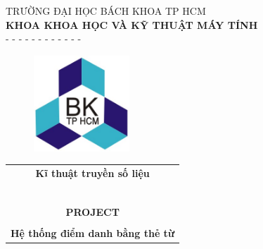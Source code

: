 \documentclass[12pt,titlepage,a4paper]{article}
\begin{document}
\begin{titlepage}
\vspace{0cm}
\begin{center}
TRƯỜNG ĐẠI HỌC BÁCH KHOA TP HCM \\
\textbf{KHOA KHOA HỌC VÀ KỸ THUẬT MÁY TÍNH } \\
- - - - - - - - - - - -
\end{center}


\vspace{1cm}
\begin{figure}[h!]
\begin{center}
\includegraphics[width=3.6cm]{hcmut.png}
\end{center}
\end{figure}
\vspace{1cm}



\begin{center}
\begin{tabular}{c}
\multicolumn{1}{c}{\textbf{{\Large Kĩ thuật truyền số liệu }}}\\
~~\\ %
\hline
\\
\multicolumn{1}{c}{\textbf{{\Large PROJECT }}}\\
\\ %
\textbf{{{\large Hệ thống điểm danh bằng thẻ từ} }} %


\\[0.35cm]
\hline
\end{tabular}
\end{center}

\begin{table}[h]
\begin{tabular}{ll}



\end{tabular}
\end{table}
\end{titlepage}
\end{document}
